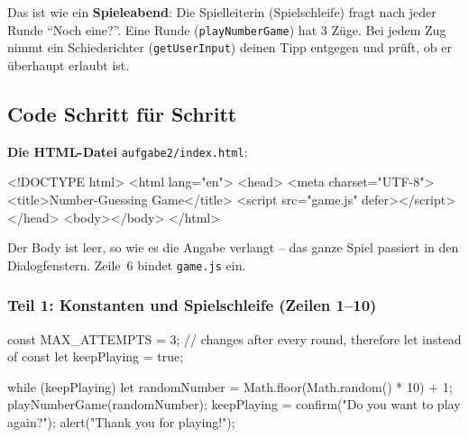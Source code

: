 \documentclass[a4paper,11pt]{article}
\begin{document}
\begin{analogie}
Das ist wie ein \textbf{Spieleabend}: Die Spielleiterin (Spielschleife) fragt nach jeder Runde "`Noch eine?"'.
Eine Runde (\texttt{playNumberGame}) hat 3 Züge. Bei jedem Zug nimmt ein Schiedsrichter (\texttt{getUserInput})
deinen Tipp entgegen und prüft, ob er überhaupt erlaubt ist.
\end{analogie}

\subsection{Code Schritt für Schritt}

\textbf{Die HTML-Datei} \texttt{aufgabe2/index.html}:
\begin{htmlcode}
<!DOCTYPE html>
<html lang="en">
<head>
    <meta charset="UTF-8">
    <title>Number-Guessing Game</title>
    <script src="game.js" defer></script>
</head>
<body></body>
</html>
\end{htmlcode}
Der Body ist leer, so wie es die Angabe verlangt -- das ganze Spiel passiert in den Dialogfenstern.
Zeile~6 bindet \texttt{game.js} ein.

\subsubsection*{Teil 1: Konstanten und Spielschleife (Zeilen 1--10)}
\begin{code}
const MAX_ATTEMPTS = 3;
// changes after every round, therefore let instead of const
let keepPlaying = true;

while (keepPlaying) {
    let randomNumber = Math.floor(Math.random() * 10) + 1;
    playNumberGame(randomNumber);
    keepPlaying = confirm("Do you want to play again?");
}
alert("Thank you for playing!");
\end{code}
\end{document}
